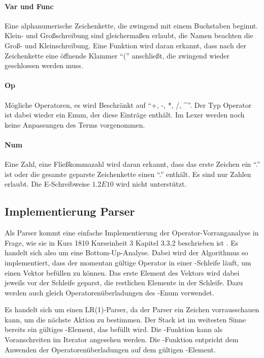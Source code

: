 \documentclass[11pt,a4paper, ngerman]{article}
\begin{document}
\paragraph{Var und Func} Eine alphanumerische Zeichenkette, die zwingend mit einem Buchstaben beginnt. Klein- und Großschreibung sind gleichermaßen erlaubt, die Namen beachten die Groß- und Kleinschreibung. Eine Funktion wird daran erkannt, dass nach der Zeichenkette eine öffnende Klammer ``('' anschließt, die zwingend wieder geschlossen werden muss.

\paragraph{Op} Mögliche Operatoren, es wird Beschränkt auf ``+, -, *, /, \^{}''. Der Typ Operator ist dabei wieder ein Enum, der diese Einträge enthält. Im Lexer werden noch keine Anpassungen des Terms vorgenommen.

\paragraph{Num} Eine Zahl, eine Fließkommazahl wird daran erkannt, dass das erste Zeichen ein ``.'' ist oder die gesamte geparste Zeichenkette einen ``.'' enthält. Es sind nur Zahlen erlaubt. Die E-Schreibweise $1.2E10$ wird nicht unterstützt.

\subsection{Implementierung Parser}
Als Parser kommt eine einfache Implementierung der Operator-Vorranganalyse in Frage, wie sie in Kurs 1810  Kurseinheit 3 Kapitel 3.3.2 beschrieben ist \cite[S. 83 ff.]{K1810}. Es handelt sich also um eine Bottom-Up-Analyse. Dabei wird der Algorithmus so implementiert, dass der momentan gültige Operator in einer -Schleife läuft, um einen Vektor befüllen zu können. Das erste Element des Vektors wird dabei jeweils vor der Schleife geparst, die restlichen Elemente in der Schleife. Dazu werden auch gleich Operatorenüberladungen des -Enum verwendet.

Es handelt sich um einen LR(1)-Parser, da der Parser ein Zeichen vorrausschauen kann, um die nächste Aktion zu bestimmen. Der Stack ist im weitesten Sinne bereits ein gültiges -Element, das befüllt wird. Die -Funktion kann als Voranschreiten im Iterator angesehen werden. Die -Funktion entpricht dem Anwenden der Operatorenüberladungen auf dem gültigen -Element.
\end{document}
